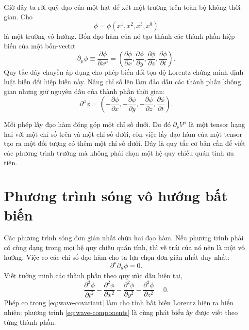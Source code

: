 Giờ đây ta rời quỹ đạo của một hạt để xét một trường trên toàn bộ không-thời gian. Cho
\begin{equation}
  \phi=\phi(x^1,x^2,x^3,x^0)
\end{equation}
là một trường vô hướng. Bốn đạo hàm của nó tạo thành các thành phần hiệp biến của một bốn-vectơ:
\begin{equation}
  \partial_\mu\phi
  \equiv\frac{\partial\phi}{\partial x^\mu}
  =\left(
    \frac{\partial\phi}{\partial x},
    \frac{\partial\phi}{\partial y},
    \frac{\partial\phi}{\partial z},
    \frac{\partial\phi}{\partial t}
  \right).
\end{equation}
Quy tắc dây chuyền áp dụng cho phép biến đổi tọa độ Lorentz chứng minh định luật biến đổi hiệp biến này. Nâng chỉ số lên làm đảo dấu các thành phần không gian nhưng giữ nguyên dấu của thành phần thời gian:
\begin{equation}
  \partial^\mu\phi
  =\left(
    -\frac{\partial\phi}{\partial x},
    -\frac{\partial\phi}{\partial y},
    -\frac{\partial\phi}{\partial z},
    \frac{\partial\phi}{\partial t}
  \right).
\end{equation}

Mỗi phép lấy đạo hàm đóng góp một chỉ số dưới. Do đó
\(\partial_\nu V^\mu\) là một tensor hạng hai với một chỉ số trên và một chỉ số dưới, còn việc lấy đạo hàm của một tensor tạo ra một đối tượng có thêm một chỉ số dưới. Đây là quy tắc cơ bản cần để viết các phương trình trường mà không phải chọn một hệ quy chiếu quán tính ưu tiên.

\section{Phương trình sóng vô hướng bất biến}

Các phương trình sóng đơn giản nhất chứa hai đạo hàm. Nếu phương trình phải có cùng dạng trong mọi hệ quy chiếu quán tính, thì vế trái của nó nên là một vô hướng. Việc co các chỉ số đạo hàm cho ta lựa chọn đơn giản nhất duy nhất:
\begin{equation}
  \boxed{\partial^\mu\partial_\mu\phi=0.}
  \label{eq:wave-covariant}
\end{equation}
Viết tường minh các thành phần theo quy ước dấu hiện tại,
\begin{equation}
  \frac{\partial^2\phi}{\partial t^2}
  -\frac{\partial^2\phi}{\partial x^2}
  -\frac{\partial^2\phi}{\partial y^2}
  -\frac{\partial^2\phi}{\partial z^2}=0.
  \label{eq:wave-components}
\end{equation}
Phép co trong \eqref{eq:wave-covariant} làm cho tính bất biến Lorentz hiện ra hiển nhiên; phương trình \eqref{eq:wave-components} là cùng phát biểu ấy được viết theo từng thành phần.


